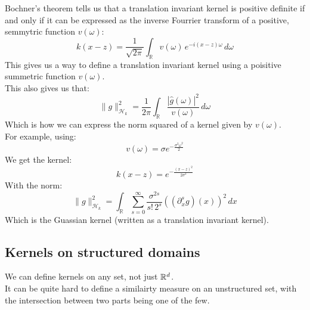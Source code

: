 \documentclass[12pt]{article}
\begin{document}
Bochner's theorem tells us that a translation
invariant kernel is positive definite
if and only if it can be expressed
as the inverse Fourrier transform of a
positive, semmytric function $v(\omega)$:
\[ k(x - z) = \frac{1}{\sqrt{2\pi}} 
\int_{\mathbb{R}} v(\omega)\, 
e^{-i (x - z)\omega} \, d\omega \]
This gives us a way to define a translation
invariant kernel using a poisitive summetric
function $v(\omega)$. \\

This also gives us that:
\[ \|g\|_{\mathcal{H}_k}^2 = \frac{1}{2\pi} 
\int_{\mathbb{R}} \frac{|\hat{g}(\omega)|^2}
{v(\omega)} \, d\omega \]
Which is how we can express the norm squared
of a kernel given by $v(\omega)$. \\

For example, using:
\[ v(\omega) = \sigma e^{-\frac{\sigma^2 \omega^2}{2}} \]
We get the kernel:
\[ k(x - z) = e^{-\frac{(x - z)^2}{2\sigma^2}} \]
With the norm:
\[ \|g\|_{\mathcal{H}_k}^2 = \int_{\mathbb{R}} 
\sum_{s=0}^{\infty} \frac{\sigma^{2s}}{s! \, 2^s} 
\left( (\partial_x^s g)(x) \right)^2 \, dx \]
Which is the Guassian kernel
(written as a translation invariant kernel). \\

\newpage

\subsection*{Kernels on structured domains}

We can define kernels on any set,
not just $\mathbb{R}^d$. \\

It can be quite hard to define
a similairty measure on an unstructured set,
with the intersection between two parts being one
of the few. \\
\end{document}
